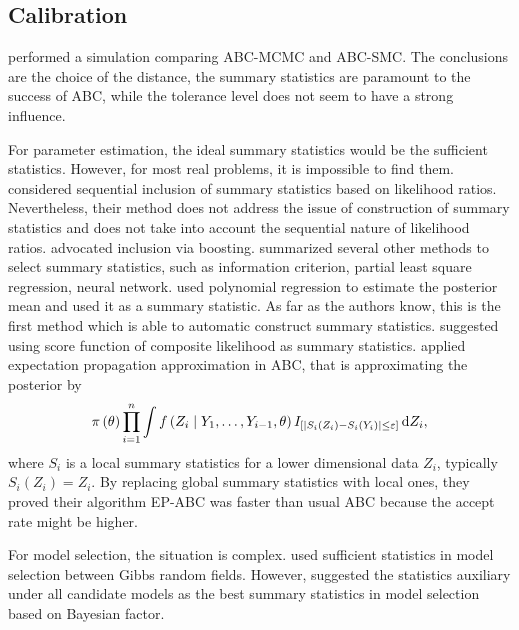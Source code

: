 \subsection{Calibration}

\citet{mckinley2009inference} performed a simulation comparing ABC-MCMC
and ABC-SMC. The conclusions are the choice of the distance, the summary
statistics are paramount to the success of ABC, while the tolerance
level does not seem to have a strong influence.

For parameter estimation, the ideal summary statistics would be the
sufficient statistics. However, for most real problems, it is impossible
to find them. \citet{joyce2008approximately} considered sequential
inclusion of summary statistics based on likelihood ratios. Nevertheless,
their method does not address the issue of construction of summary
statistics and does not take into account the sequential nature of
likelihood ratios. \citet{aeschbacher2012novel} advocated inclusion
via boosting. \citet{blum2013comparative} summarized several other
methods to select summary statistics, such as information criterion,
partial least square regression, neural network. \citet{fearnhead2012constructing}
used polynomial regression to estimate the posterior mean and used
it as a summary statistic. As far as the authors know, this is the
first method which is able to automatic construct summary statistics.
\citet{ruli2013approximate} suggested using score function of composite
likelihood as summary statistics. \citet{barthelme2014expectation}
applied expectation propagation approximation in ABC, that is approximating
the posterior by 
\[
\pi\left(\theta\right)\prod_{i=1}^{n}\int f\left(Z_{i}\mid Y_{1},\ldots,Y_{i-1},\theta\right)I_{\left[\left|S_{i}\left(Z_{i}\right)-S_{i}\left(Y_{i}\right)\right|\le\varepsilon\right]}\,\mathrm{d} Z_{i},
\]
where $S_{i}$ is a local summary statistics for a lower dimensional
data $Z_{i}$, typically $S_{i}\left(Z_{i}\right)=Z_{i}$. By replacing
global summary statistics with local ones, they proved their algorithm
EP-ABC was faster than usual ABC because the accept rate might be
higher.

For model selection, the situation is complex. \citet{grelaud2009abc}
used sufficient statistics in model selection between Gibbs random
fields. However, \citet{marin2014relevant} suggested the statistics
auxiliary under all candidate models as the best summary statistics
in model selection based on Bayesian factor.%
\begin{comment}
add the paper post the problem of model selection in abc
\end{comment}


